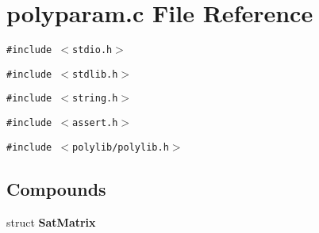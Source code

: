 \section{polyparam.c File Reference}
\label{polyparam_8c}
{\tt \#include $<$stdio.h$>$}\par
{\tt \#include $<$stdlib.h$>$}\par
{\tt \#include $<$string.h$>$}\par
{\tt \#include $<$assert.h$>$}\par
{\tt \#include $<$polylib/polylib.h$>$}\par
\subsection*{Compounds}
\begin{CompactItemize}
\item 
struct {\bf Sat\-Matrix}
\end{CompactItemize}
